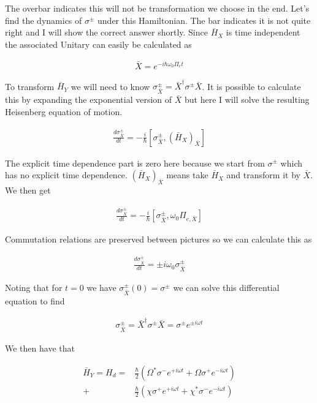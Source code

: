 \documentclass[12pt]{article}
\newcommand{\ddt}[1]{\frac{d #1}{dt}}
\begin{document}
The overbar indicates this will not be transformation we choose in the end.
Let's find the dynamics of $\sigma^{\pm}$ under this Hamiltonian. The bar indicates it is not quite right and I will show the correct answer shortly. Since $\bar{H}_X$ is time independent the associated Unitary can easily be calculated as

\begin{align}
\bar{X} = e^{-i\hbar\omega_0 \Pi_{e} t}
\end{align}

To transform $\bar{H}_Y$ we will need to know $\sigma^{\pm}_{\bar{X}} = \bar{X}^{\dag}\sigma^{\pm} \bar{X}$. It is possible to calculate this by expanding the exponential version of $\bar{X}$ but here I will solve the resulting Heisenberg equation of motion.

\begin{align}
\ddt{\sigma^{\pm}_{\bar{X}}} = -\frac{i}{\hbar}[\sigma^{\pm}_{\bar{X}},(\bar{H}_X)_{\bar{X}}]
\end{align}

The explicit time dependence part is zero here because we start from $\sigma^{\pm}$ which has no explicit time dependence. $(\bar{H}_X)_{\bar{X}}$ means take $\bar{H}_X$ and transform it by $\bar{X}$. We then get

\begin{align}
\ddt{\sigma^{\pm}_{\bar{X}}} = -\frac{i}{\hbar} [\sigma_{\bar{X}}^{\pm},\omega_0 \Pi_{e,\bar{X}}]
\end{align}

Commutation relations are preserved between pictures so we can calculate this as

\begin{align}
\ddt{\sigma^{\pm}_{\bar{X}}} = \pm i \omega_0 \sigma^{\pm}_{\bar{X}}
\end{align}

Noting that for $t=0$ we have $\sigma^{\pm}_{\bar{X}}(0) = \sigma^{\pm}$ we can solve this differential equation to find

\begin{align}
\sigma^{\pm}_{\bar{X}} = \bar{X}^{\dag}\sigma^{\pm}\bar{X} = \sigma^{\pm} e^{\pm i \omega t}
\end{align}

We then have that 

\begin{align}
\bar{H}_Y = H_d = &\frac{\hbar}{2}\left(\Omega^* \sigma^- e^{+i\omega t} + \Omega \sigma^+ e^{-i\omega t} \right)\\
+ &\frac{\hbar}{2}\left( \chi\sigma^+e^{+i\omega t} + \chi^* \sigma^-e^{-i\omega t} \right)
\end{align}
\end{document}
